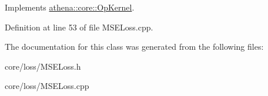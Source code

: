 Implements \mbox{\hyperlink{classathena_1_1core_1_1_op_kernel_a762e541463ffd089b47a8e6755c30fe1}{athena\+::core\+::\+Op\+Kernel}}.



Definition at line 53 of file M\+S\+E\+Loss.\+cpp.



The documentation for this class was generated from the following files\+:\begin{DoxyCompactItemize}
\item 
core/loss/M\+S\+E\+Loss.\+h\item 
core/loss/M\+S\+E\+Loss.\+cpp\end{DoxyCompactItemize}
